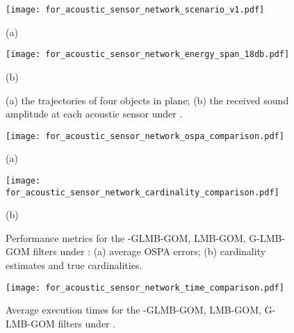 \documentclass[journal]{IEEEtran}
\begin{document}
{\begin{figure}[h]
\setlength{\abovecaptionskip}{-7pt}
\setlength{\belowcaptionskip}{-7pt}
\begin{minipage}[b]{0.48\linewidth}
  \centering
\centerline{\texttt{[image: for\_acoustic\_sensor\_network\_scenario\_v1.pdf]}}
\centerline{\small{\small{(a)}} }\medskip
\end{minipage}
\hfill
\begin{minipage}[b]{0.48\linewidth}
  \centering
\centerline{\texttt{[image: for\_acoustic\_sensor\_network\_energy\_span\_18db.pdf]}}
\centerline{\small{\small{(b)}}}\medskip
\end{minipage}
\caption{(a)  the trajectories of four objects in  plane; (b) the received sound amplitude at each acoustic sensor under .}
  \label{fig: scenario and time}
\end{figure}
\begin{figure}[h]
\setlength{\abovecaptionskip}{-7pt}
\setlength{\belowcaptionskip}{-7pt}
\begin{minipage}[b]{0.48\linewidth}
  \centering
\centerline{\texttt{[image: for\_acoustic\_sensor\_network\_ospa\_comparison.pdf]}}
\centerline{\small{\small{(a)}} }\medskip
\end{minipage}
\hfill
\begin{minipage}[b]{0.47\linewidth}
  \centering
\centerline{\texttt{[image: for\_acoustic\_sensor\_network\_cardinality\_comparison.pdf]}}
\centerline{\small{\small{(b)}}}\medskip
\end{minipage}
\caption{Performance metrics for the -GLMB-GOM, LMB-GOM, G-LMB-GOM filters under : (a) average OSPA errors; (b) cardinality estimates and true cardinalities.}
  \label{fig: performance of four targets}
\end{figure}

\begin{figure}[t]
  \centering
  \texttt{[image: for\_acoustic\_sensor\_network\_time\_comparison.pdf]}\\
  \caption{Average execution times  for the -GLMB-GOM, LMB-GOM, G-LMB-GOM filters under  .}
  \label{fig:time comparison}
\end{figure}





}
\end{document}
